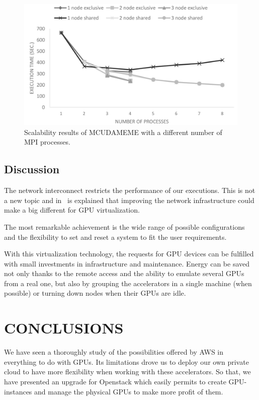 \documentclass[a4paper,twoside]{article}
\begin{document}
\begin{figure}[htb]
  \centering
  \includegraphics[width=\linewidth]{images/mcudameme-os.pdf}
  \caption{Scalability results of MCUDAMEME with a different number of MPI processes.}
  \label{fig3}
\end{figure}

\subsection{Discussion}
The network interconnect restricts the performance of our executions.
This is not a new topic and in~\cite{tonithesis} is explained that improving the network infrastructure could make a big different for GPU virtualization.

The most remarkable achievement is the wide range of possible configurations and the flexibility to set and reset a system to fit the 
user requirements. 

With this virtualization technology, the requests for GPU devices can be fulfilled with small investments in infrastructure and maintenance.
Energy can be saved not only thanks to the remote access and the ability to emulate several GPUs from a real one, but also  by grouping the accelerators in a single machine (when possible) or turning down nodes when their GPUs are idle. 

\section{\uppercase{Conclusions}}
\label{sec:conclusions}
We have seen a thoroughly study of the possibilities offered by AWS in everything to do with GPUs. Its limitations drove us to deploy our own private cloud to have more flexibility when working with these accelerators.
So that, we have presented an upgrade for Openstack which easily permits to create GPU-instances and manage the physical GPUs to make more profit of them.
\end{document}
